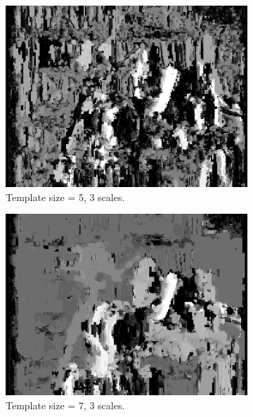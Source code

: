 \documentclass[12pt,a4paper,oneside,final]{article}
\begin{document}
\begin{table}[H]
\begin{subtable}{1\textwidth}
\begin{figure}[H]
\begin{subfigure}[b]{0.24\textwidth}
			\includegraphics[width=\textwidth]{disparity_s3_k5set_1.png}
			\caption{Template size = 5, 3 scales.}
		\end{subfigure}
		\begin{subfigure}[b]{0.24\textwidth}
			\includegraphics[width=\textwidth]{disparity_s3_k7set_1.png}
			\caption{Template size = 7, 3 scales.}
		\end{subfigure}
		\begin{subfigure}[b]{0.24\textwidth}

\end{subfigure}
\end{figure}
\end{subtable}
\end{table}
\end{document}
